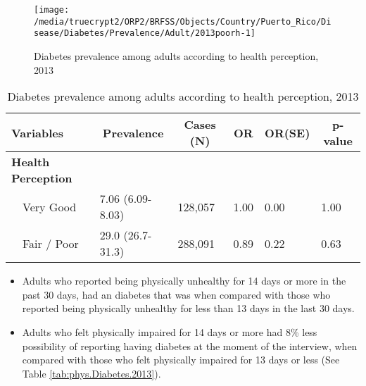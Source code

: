 \begin{figure}[H]
\caption{Diabetes prevalence among adults according to health perception,
         2013}
\label{fig:fairpoor.Diabetes.2013}

\begin{knitrout}
\color{fgcolor}

{\centering \texttt{[image: /media/truecrypt2/ORP2/BRFSS/Objects/Country/Puerto\_Rico/Disease/Diabetes/Prevalence/Adult/2013poorh-1]} 

}



\end{knitrout}
 \end{figure}

\begin{table}[H]
\caption{Diabetes prevalence  among adults according to health perception, 2013\label{tab:fairpoor.Diabetes.2013}} 
\begin{center}
\begin{tabular}{llllll}
\hline\hline
\multicolumn{1}{l}{Variables}&\multicolumn{1}{c}{Prevalence}&\multicolumn{1}{c}{Cases (N)}&\multicolumn{1}{c}{OR}&\multicolumn{1}{c}{OR(SE)}&\multicolumn{1}{c}{p-value}\tabularnewline
\hline
{\bfseries Health Perception}&&&&&\tabularnewline
~~Very Good&7.06 (6.09-8.03)&128,057&1.00&0.00&1.00\tabularnewline
~~Fair / Poor&29.0 (26.7-31.3)&288,091&0.89&0.22&0.63\tabularnewline
\hline
\end{tabular}\end{center}

\end{table}

 
\newpage

 \newpage
\begin{itemize}

\item Adults who reported being physically unhealthy for 14 days or more in the past 30 days, had an diabetes that was 
 when compared with 
those who reported being physically unhealthy for less than 13 days in the last 30 days.


\item Adults who felt physically impaired for 14 days or more had 8\% less possibility of reporting having diabetes at the moment of the interview, when compared with those who felt physically impaired for 13 days or less (See Table \ref{tab:phys.Diabetes.2013}).

\end{itemize}

